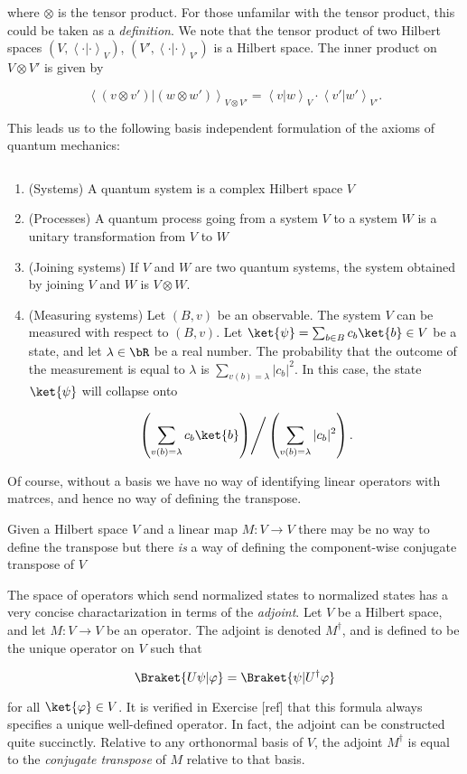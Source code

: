 where $\otimes$ is the tensor product. For those unfamilar with the tensor product, this could be taken as a {\em definition}. We note that the tensor product of two Hilbert spaces $(V,\left<\cdot|\cdot\right>_V)$, $(V',\left<\cdot|\cdot\right>_{V'})$ is a Hilbert space. The inner product on $V\otimes V'$ is given by

$$\left<(v\otimes v')| (w\otimes w')\right>_{V\otimes V'}=\left<v | w\right>_V\cdot \left<v' | w'\right>_{V'}.$$

This leads us to the following basis independent formulation of the axioms of quantum mechanics:

\begin{defn} $\,$

\begin{enumerate}
\item (Systems) A quantum system is a complex Hilbert space $V$
\item (Processes) A quantum process going from a system $V$ to a system $W$ is a unitary transformation from $V$ to $W$
\item (Joining systems) If $V$ and $W$ are two quantum systems, the system obtained by joining $V$ and $W$ is $V\otimes W$.
\item (Measuring systems) Let $(B,v)$ be an observable. The system $V$ can be measured with respect to $(B,v)$. Let $\ket{\psi}=\sum_{b\in B}c_b \ket{b}\in V$ be a state, and let $\lambda\in \bR$ be a real number. The probability that the outcome of the measurement is equal to $\lambda$ is $\sum_{v(b)=\lambda}|c_b|^2$. In this case, the state $\ket{\psi}$ will collapse onto

$$\left.\left(\sum_{v(b)=\lambda}c_b \ket{b}\right)\right/ \left(\sum_{v(b)=\lambda}|c_b|^2\right).$$
\end{enumerate}

\raggedleft\qedsymbol{}
\end{defn}

 Of course, without a basis we have no way of identifying linear operators with matrces, and hence no way of defining the transpose. 

Given a Hilbert space $V$ and a linear map $M:V\to V$ there may be no way to define the transpose but there {\em is} a way of defining the component-wise conjugate transpose of $V$

\begin{rem}
The space of operators which send normalized states to normalized states has a very concise charactarization in terms of the {\em adjoint}. Let $V$ be a Hilbert space, and let $M:V\to V$ be an operator. The adjoint is denoted $M^\dagger$, and is defined to be the unique operator on $V$ such that

$$\Braket{ U \psi  | \varphi}=\Braket{\psi | U^\dagger \varphi}$$

for all $\ket{\varphi}\in V$. It is verified in Exercise [ref] that this formula always specifies a unique well-defined operator. In fact, the adjoint can be constructed quite succinctly. Relative to any orthonormal basis of $V$, the adjoint $M^\dagger$ is equal to the {\em conjugate transpose} of $M$ relative to that basis.
\end{rem}

